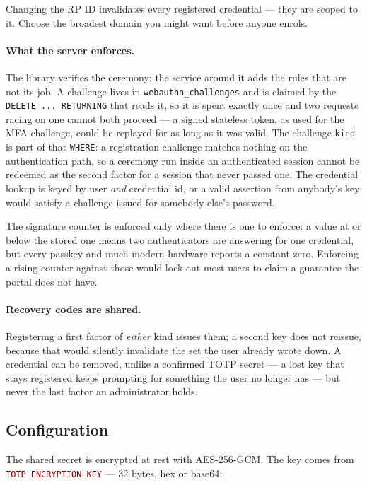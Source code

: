 \documentclass[12pt,a4paper,twoside]{report}
\newcommand{\code}[1]{\texttt{#1}}
\newcommand{\env}[1]{\texttt{\textcolor{Maroon}{#1}}}
\begin{document}
Changing the RP ID invalidates every registered credential --- they are scoped to
it. Choose the broadest domain you might want before anyone enrols.

\paragraph{What the server enforces.}
The library verifies the ceremony; the service around it adds the rules that are
not its job. A challenge lives in \code{webauthn\_challenges} and is claimed by
the \code{DELETE ... RETURNING} that reads it, so it is spent exactly once and two
requests racing on one cannot both proceed --- a signed stateless token, as used
for the MFA challenge, could be replayed for as long as it was valid. The
challenge \code{kind} is part of that \code{WHERE}: a registration challenge
matches nothing on the authentication path, so a ceremony run inside an
authenticated session cannot be redeemed as the second factor for a session that
never passed one. The credential lookup is keyed by user \emph{and} credential id,
or a valid assertion from anybody's key would satisfy a challenge issued for
somebody else's password.

The signature counter is enforced only where there is one to enforce: a value at
or below the stored one means two authenticators are answering for one credential,
but every passkey and much modern hardware reports a constant zero. Enforcing a
rising counter against those would lock out most users to claim a guarantee the
portal does not have.

\paragraph{Recovery codes are shared.} Registering a first factor of
\emph{either} kind issues them; a second key does not reissue, because that would
silently invalidate the set the user already wrote down. A credential can be
removed, unlike a confirmed TOTP secret --- a lost key that stays registered keeps
prompting for something the user no longer has --- but never the last factor an
administrator holds.

\subsection*{Configuration}

The shared secret is encrypted at rest with AES-256-GCM. The key comes from
\env{TOTP\_ENCRYPTION\_KEY} — 32 bytes, hex or base64:
\end{document}
